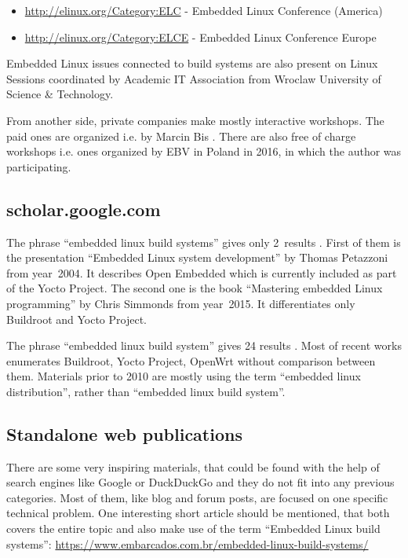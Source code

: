 \documentclass[printmode]{mgr}
\begin{document}
\begin{itemize}
  \itemsep0em
  \item \url{http://elinux.org/Category:ELC} - Embedded Linux Conference (America)
  \item \url{http://elinux.org/Category:ELCE} - Embedded Linux Conference Europe
\end{itemize}

Embedded Linux issues connected to build systems are also present on Linux Sessions \cite{web:sesja-linuksowa} coordinated by Academic IT Association from Wroclaw University of Science \& Technology.

From another side, private companies make mostly interactive workshops. The paid ones are organized i.e. by Marcin Bis \cite{web:bis-szkolenia}. There are also free of charge workshops i.e. ones organized by EBV in Poland in 2016, in which the author was participating.

\subsection*{scholar.google.com}
The phrase ``embedded linux build systems'' gives only 2~results  \cite{web:scholar-1}. First of them is the presentation ``Embedded Linux system development'' by Thomas Petazzoni from year~2004. It describes Open Embedded which is currently included as part of the Yocto Project. The second one is the book ``Mastering embedded Linux programming'' by Chris Simmonds from year~2015. It differentiates only Buildroot and Yocto Project.

The phrase ``embedded linux build system'' gives 24 results \cite{web:scholar-2}. Most of recent works enumerates Buildroot, Yocto Project, OpenWrt without comparison between them. Materials prior to 2010 are mostly using the term ``embedded linux distribution'', rather than ``embedded linux build system''.

\subsection*{Standalone web publications}

There are some very inspiring materials, that could be found with the help of search engines like Google or DuckDuckGo and they do not fit into any previous categories.
Most of them, like blog and forum posts, are focused on one specific technical problem.
One interesting short article should be mentioned, that both covers the entire topic and also make use of the term ``Embedded Linux build systems'': \url{https://www.embarcados.com.br/embedded-linux-build-systems/}
\end{document}
